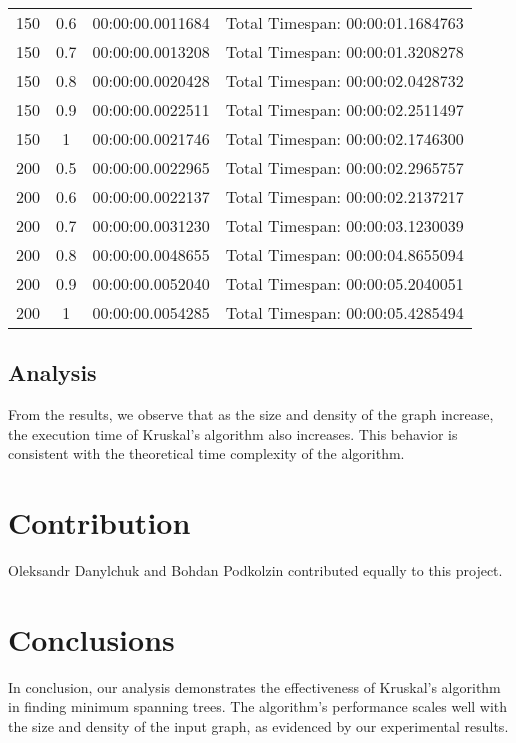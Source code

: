 \documentclass{article}
\begin{document}
\begin{table}[htbp]
\begin{tabular}{cccc}
        150 & 0.6 & 00:00:00.0011684 & Total Timespan: 00:00:01.1684763 \\
        150 & 0.7 & 00:00:00.0013208 & Total Timespan: 00:00:01.3208278 \\
        150 & 0.8 & 00:00:00.0020428 & Total Timespan: 00:00:02.0428732 \\
        150 & 0.9 & 00:00:00.0022511 & Total Timespan: 00:00:02.2511497 \\
        150 & 1 & 00:00:00.0021746 & Total Timespan: 00:00:02.1746300 \\
        \midrule
        200 & 0.5 & 00:00:00.0022965 & Total Timespan: 00:00:02.2965757 \\
        200 & 0.6 & 00:00:00.0022137 & Total Timespan: 00:00:02.2137217 \\
        200 & 0.7 & 00:00:00.0031230 & Total Timespan: 00:00:03.1230039 \\
        200 & 0.8 & 00:00:00.0048655 & Total Timespan: 00:00:04.8655094 \\
        200 & 0.9 & 00:00:00.0052040 & Total Timespan: 00:00:05.2040051 \\
        200 & 1 & 00:00:00.0054285 & Total Timespan: 00:00:05.4285494 \\
        \bottomrule
    \end{tabular}
\end{table}

\subsection{Analysis}
From the results, we observe that as the size and density of the graph increase, the execution time of Kruskal's algorithm also increases. This behavior is consistent with the theoretical time complexity of the algorithm.

\section{Contribution}
Oleksandr Danylchuk and Bohdan Podkolzin contributed equally to this project.

\section{Conclusions}
In conclusion, our analysis demonstrates the effectiveness of Kruskal's algorithm in finding minimum spanning trees. The algorithm's performance scales well with the size and density of the input graph, as evidenced by our experimental results.
\end{document}
